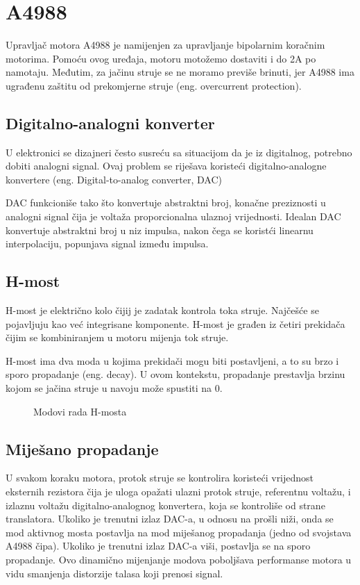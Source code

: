 \documentclass[../Document.tex]{subfiles}
\begin{document}
\section{A4988}
Upravljač motora A4988 je namijenjen za upravljanje bipolarnim koračnim motorima. Pomoću ovog uređaja, motoru motožemo dostaviti i do 2A po namotaju. Međutim, za jačinu struje se ne moramo previše brinuti, jer A4988 ima ugrađenu zaštitu od prekomjerne struje (eng. overcurrent protection).

\subsection{Digitalno-analogni konverter}
U elektronici se dizajneri često susreću sa situacijom da je iz digitalnog, potrebno dobiti analogni signal. Ovaj problem se riješava koristeći digitalno-analogne konvertere (eng. Digital-to-analog converter, DAC)

DAC funkcioniše tako što konvertuje abstraktni broj, konačne preziznosti u analogni signal čija je voltaža proporcionalna ulaznoj vrijednosti. Idealan DAC konvertuje abstraktni broj u niz impulsa, nakon čega se koristći linearnu interpolaciju, popunjava signal između impulsa.

\subsection{H-most}
H-most je električno kolo čijij je zadatak kontrola toka struje. Najčešće se pojavljuju kao već integrisane komponente. H-most je građen iz četiri prekidača čijim se kombiniranjem u motoru mijenja tok struje.


H-most ima dva moda u kojima prekidači mogu biti postavljeni, a to su brzo i sporo propadanje (eng. decay). U ovom kontekstu, propadanje prestavlja brzinu kojom se jačina struje u navoju može spustiti na 0.

\begin{figure}
    \centering
    \qquad
    \caption{Modovi rada H-mosta}%
\end{figure}

\subsection{Miješano propadanje}
U svakom koraku motora, protok struje se kontrolira koristeći vrijednost eksternih rezistora čija je uloga opažati ulazni protok struje, referentnu voltažu, i izlaznu voltažu digitalno-analognog konvertera, koja se kontroliše od strane translatora. Ukoliko je trenutni izlaz DAC-a, u odnosu na prošli niži, onda se mod aktivnog mosta postavlja na mod miješanog propadanja (jedno od svojstava A4988 čipa). Ukoliko je trenutni izlaz DAC-a viši, postavlja se na sporo propadanje. Ovo dinamično mijenjanje modova poboljšava performanse motora u vidu smanjenja distorzije talasa koji prenosi signal.
\end{document}
